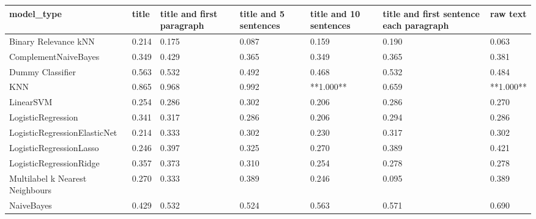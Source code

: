 \begin{tabular}{lllllll}
\toprule
                     model\_type & title & title and first paragraph & title and 5 sentences & title and 10 sentences & title and first sentence each paragraph &  raw text \\
\midrule
           Binary Relevance kNN & 0.214 &                     0.175 &                 0.087 &                  0.159 &                                   0.190 &     0.063 \\
           ComplementNaiveBayes & 0.349 &                     0.429 &                 0.365 &                  0.349 &                                   0.365 &     0.381 \\
               Dummy Classifier & 0.563 &                     0.532 &                 0.492 &                  0.468 &                                   0.532 &     0.484 \\
                            KNN & 0.865 &                     0.968 &                 0.992 &              **1.000** &                                   0.659 & **1.000** \\
                      LinearSVM & 0.254 &                     0.286 &                 0.302 &                  0.206 &                                   0.286 &     0.270 \\
             LogisticRegression & 0.341 &                     0.317 &                 0.286 &                  0.206 &                                   0.294 &     0.286 \\
   LogisticRegressionElasticNet & 0.214 &                     0.333 &                 0.302 &                  0.230 &                                   0.317 &     0.302 \\
        LogisticRegressionLasso & 0.246 &                     0.397 &                 0.325 &                  0.270 &                                   0.389 &     0.421 \\
        LogisticRegressionRidge & 0.357 &                     0.373 &                 0.310 &                  0.254 &                                   0.278 &     0.278 \\
Multilabel k Nearest Neighbours & 0.270 &                     0.333 &                 0.389 &                  0.246 &                                   0.095 &     0.389 \\
                     NaiveBayes & 0.429 &                     0.532 &                 0.524 &                  0.563 &                                   0.571 &     0.690 \\

\end{tabular}
